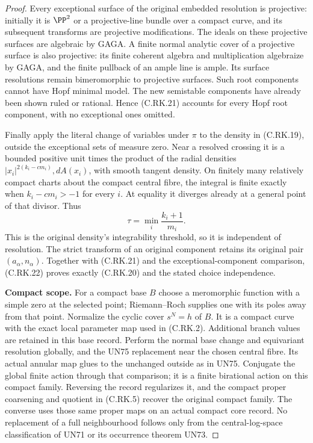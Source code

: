 \begin{proof}
Every exceptional surface of
the original embedded resolution
is projective: initially it is
$\PP^2$ or a projective-line
bundle over a compact curve,
and its subsequent transforms
are projective modifications.
The ideals on these projective
surfaces are algebraic by GAGA.
A finite normal analytic cover
of a projective surface is also
projective: its finite coherent
algebra and multiplication
algebraize by GAGA, and the
finite pullback of an ample
line is ample. Its surface
resolutions remain bimeromorphic
to projective surfaces. Such
root components cannot have
Hopf minimal model. The new
semistable components have
already been shown ruled or
rational. Hence (C.RK.21)
accounts for every Hopf root
component, with no exceptional
ones omitted.

Finally apply the literal change
of variables under $\pi$ to the
density in (C.RK.19), outside
the exceptional sets of measure
zero. Near a resolved crossing
it is a bounded positive unit
times the product of the radial
densities
$|x_i|^{2(k_i-cm_i)},dA(x_i)$,
with smooth tangent density.
On finitely many relatively
compact charts about the compact
central fibre, the integral is
finite exactly when
$k_i-cm_i>-1$ for every $i$.
At equality it diverges already
at a general point of that
divisor. Thus
\[
                             \tau=\min_i\frac{k_i+1}{m_i}.
\tag{C.RK.22}
\]
This is the original density's
integrability threshold, so it
is independent of resolution.
The strict transform of an
original component retains
its original pair
$(a_\alpha,n_\alpha)$.
Together with (C.RK.21) and the
exceptional-component comparison,
(C.RK.22) proves exactly
(C.RK.20) and the stated
choice independence.

\par\medskip\noindent\textbf{Compact scope.}
For a compact base $B$ choose
a meromorphic function with
a simple zero at the selected
point; Riemann--Roch supplies
one with its poles away from
that point. Normalize the
cyclic cover $s^N=h$ of $B$.
It is a compact curve with
the exact local parameter
map used in (C.RK.2).
Additional branch values
are retained in this base
record. Perform the normal
base change and equivariant
resolution globally, and
the UN75 replacement near
the chosen central fibre.
Its actual annular map
glues to the unchanged
outside as in UN75. Conjugate
the global finite action
through that comparison;
it is a finite birational
action on this compact
family. Reversing the
record regularizes it,
and the compact proper
coarsening and quotient
in (C.RK.5) recover the
original compact family.
The converse uses those
same proper maps on an
actual compact core record.
No replacement of a full
neighbourhood follows only
from the central-log-space
classification of UN71
or its occurrence theorem
UN73.
\end{proof}
